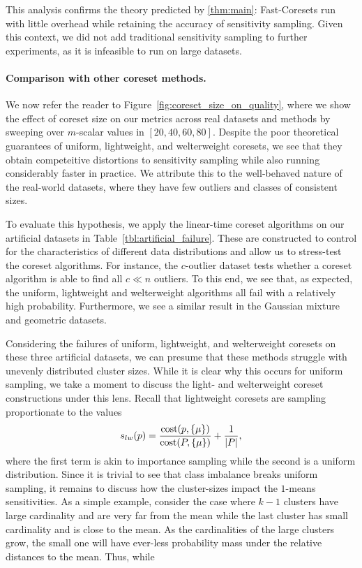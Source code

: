 This analysis confirms the theory predicted by \cref{thm:main}: Fast-Coresets run with little overhead while retaining the accuracy of sensitivity sampling.
Given this context, we did not add traditional sensitivity sampling to further experiments, as it is infeasible to run on large datasets.


\paragraph*{Comparison with other coreset methods.}


We now refer the reader to Figure~\ref{fig:coreset_size_on_quality}, where we show the effect of coreset size on our metrics across real datasets and methods by
sweeping over $m$-scalar values in $[20, 40, 60, 80]$. Despite the poor theoretical guarantees of uniform, lightweight, and welterweight coresets, we see that
they obtain competeitive distortions to sensitivity sampling while also running considerably faster in practice. We attribute this to the well-behaved nature of
the real-world datasets, where they have few outliers and classes of consistent sizes.

To evaluate this hypothesis, we apply the linear-time coreset algorithms on our artificial datasets in Table~\ref{tbl:artificial_failure}. These are constructed
to control for the characteristics of different data distributions and allow us to stress-test the coreset algorithms. For instance, the $c$-outlier dataset
tests whether a coreset algorithm is able to find all $c \ll n$ outliers. To this end, we see that, as expected, the uniform, lightweight and welterweight
algorithms all fail with a relatively high probability. Furthermore, we see a similar result in the Gaussian mixture and geometric datasets.

Considering the failures of uniform, lightweight, and welterweight coresets on these three artificial datasets, we can presume that these methods
struggle with unevenly distributed cluster sizes. While it is clear why this occurs for uniform sampling, we take a moment to discuss the light- and
welterweight coreset constructions under this lens. Recall that lightweight coresets are sampling proportionate to the values
\[ s_{lw}(p) = \dfrac{\operatorname{cost}(p, \{\mu\})}{\operatorname{cost}(P, \{\mu\})} + \dfrac{1}{|P|},\]
where the first term is akin to importance sampling while the second is a uniform distribution. Since it is trivial to see that class imbalance breaks uniform
sampling, it remains to discuss how the cluster-sizes impact the $1$-means sensitivities. As a simple example, consider the case where $k-1$ clusters have large
cardinality and are very far from the mean while the last cluster has small cardinality and is close to the mean. As the cardinalities of the large clusters
grow, the small one will have ever-less probability mass under the relative distances to the mean. Thus, while 

